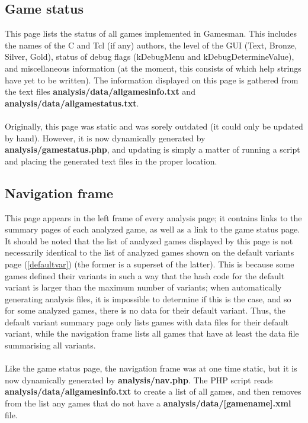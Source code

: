 \documentclass[11pt]{article}
\newcommand{\gcref}[1]{\textcolor{cyan}{\underline{\ref{#1}}}}
\begin{document}
\subsection{Game status}
This page lists the status of all games implemented in Gamesman. This includes the names of the C and Tcl (if any) authors, the level of the GUI (Text, Bronze, Silver, Gold), status of debug flags (kDebugMenu and kDebugDetermineValue), and miscellaneous information (at the moment, this consists of which help strings have yet to be written). The information displayed on this page is gathered from the text files \textbf{analysis/data/allgamesinfo.txt} and \textbf{analysis/data/allgamestatus.txt}.
\\\\Originally, this page was static and was sorely outdated (it could only be updated by hand). However, it is now dynamically generated by \textbf{analysis/gamestatus.php}, and updating is simply a matter of running a script and placing the generated text files in the proper location.
\subsection{Navigation frame}
This page appears in the left frame of every analysis page; it contains links to the summary pages of each analyzed game, as well as a link to the game status page. It should be noted that the list of analyzed games displayed by this page is not necessarily identical to the list of analyzed games shown on the default variants page (\gcref{defaultvar}) (the former is a superset of the latter). This is because some games  defined their variants in such a way that the hash code for the default variant is larger than the maximum number of variants; when automatically generating analysis files, it is impossible to determine if this is the case, and so for some analyzed games, there is no data for their default variant. Thus, the default variant summary page only lists games with data files for their default variant, while the navigation frame lists all games that have at least the data file summarising all variants.
\\\\Like the game status page, the navigation frame was at one time static, but it is now dynamically generated by \textbf{analysis/nav.php}. The PHP script reads \textbf{analysis/data/allgamesinfo.txt} to create a list of all games, and then removes from the list any games that do not have a \textbf{analysis/data/[gamename].xml} file.
\end{document}
